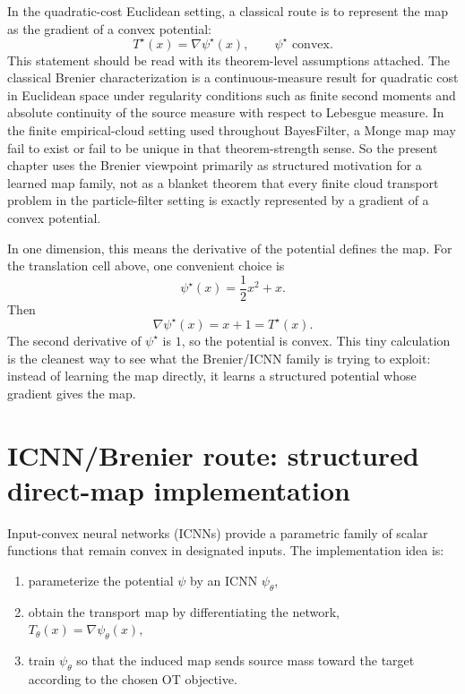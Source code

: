In the quadratic-cost Euclidean setting, a classical route is to represent the
map as the gradient of a convex potential:
\begin{equation}
\label{eq:bf-neural-ot-direct-brenier}
  T^\star(x)=\nabla\psi^\star(x),
  \qquad
  \psi^\star\text{ convex}.
\end{equation}
This statement should be read with its theorem-level assumptions attached.  The
classical Brenier characterization is a continuous-measure result for quadratic
cost in Euclidean space under regularity conditions such as finite second
moments and absolute continuity of the source measure with respect to Lebesgue
measure.  In the finite empirical-cloud setting used throughout BayesFilter, a
Monge map may fail to exist or fail to be unique in that theorem-strength sense.
So the present chapter uses the Brenier viewpoint primarily as structured
motivation for a learned map family, not as a blanket theorem that every finite
cloud transport problem in the particle-filter setting is exactly represented by
a gradient of a convex potential.

In one dimension, this means the derivative of the potential defines the map.
For the translation cell above, one convenient choice is
\begin{equation}
\label{eq:bf-neural-ot-direct-brenier-example}
  \psi^\star(x)=\frac{1}{2}x^2+x.
\end{equation}
Then
\begin{equation}
\label{eq:bf-neural-ot-direct-brenier-example-grad}
  \nabla\psi^\star(x)=x+1=T^\star(x).
\end{equation}
The second derivative of \(\psi^\star\) is \(1\), so the potential is convex.
This tiny calculation is the cleanest way to see what the Brenier/ICNN family is
trying to exploit: instead of learning the map directly, it learns a structured
potential whose gradient gives the map.

\section{ICNN/Brenier route: structured direct-map implementation}
\label{sec:bf-neural-ot-direct-icnn}

Input-convex neural networks (ICNNs) provide a parametric family of scalar
functions that remain convex in designated inputs.  The implementation idea is:
\begin{enumerate}[label=(\roman*)]
  \item parameterize the potential \(\psi\) by an ICNN \(\psi_\theta\),
  \item obtain the transport map by differentiating the network,
  \(
    T_\theta(x)=\nabla\psi_\theta(x),
  \)
  \item train \(\psi_\theta\) so that the induced map sends source mass toward
  the target according to the chosen OT objective.
\end{enumerate}

